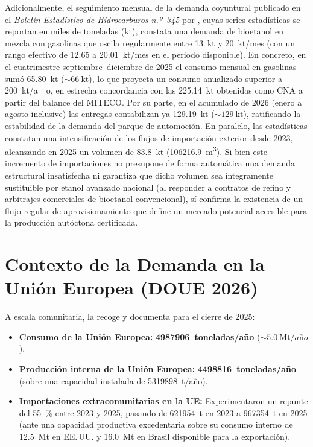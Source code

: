 \documentclass{report}
\begin{document}
Adicionalmente, el seguimiento mensual de la demanda coyuntural publicado en el \textit{Boletín Estadístico de Hidrocarburos n.º~345} por \textcite{CORES2026}, cuyas series estadísticas se reportan en miles de toneladas (\si{\kilo\tonne}), constata una demanda de bioetanol en mezcla con gasolinas que oscila regularmente entre \SI{13}{\kilo\tonne} y \SI{20}{\kilo\tonne/mes} (con un rango efectivo de \num{12.65} a \SI{20.01}{\kilo\tonne/mes} en el periodo disponible). En concreto, en el cuatrimestre septiembre--diciembre de 2025 el consumo mensual en gasolinas sumó \SI{65.80}{\kilo\tonne} ($\sim \SI{66}{\kilo\tonne}$), lo que proyecta un consumo anualizado superior a \SI{200}{\kilo\tonne/ao}, en estrecha concordancia con las \SI{225.14}{\kilo\tonne} obtenidas como CNA a partir del balance del MITECO. Por su parte, en el acumulado de 2026 (enero a agosto inclusive) las entregas contabilizan ya \SI{129.19}{\kilo\tonne} ($\sim \SI{129}{\kilo\tonne}$), ratificando la estabilidad de la demanda del parque de automoción. En paralelo, las estadísticas constatan una intensificación de los flujos de importación exterior desde 2023, alcanzando en 2025 un volumen de \SI{83.8}{\kilo\tonne} (\SI{106216.9}{\cubic\meter}). Si bien este incremento de importaciones no presupone de forma automática una demanda estructural insatisfecha ni garantiza que dicho volumen sea íntegramente sustituible por etanol avanzado nacional (al responder a contratos de refino y arbitrajes comerciales de bioetanol convencional), sí confirma la existencia de un flujo regular de aprovisionamiento que define un mercado potencial accesible para la producción autóctona certificada.

\section{Contexto de la Demanda en la Unión Europea (DOUE 2026)}
A escala comunitaria, la \textcite[Considerandos~5, 9 y~10; Cuadro~1 y Nota~7]{DOUE2026} recoge y documenta para el cierre de 2025:
\begin{itemize}
    \item \textbf{Consumo de la Unión Europea:} \textbf{\num{4987906}~toneladas/año} ($\sim \SI{5.0}{\mega\tonne/a\text{\~{n}}o}$).
    \item \textbf{Producción interna de la Unión Europea:} \textbf{\num{4498816}~toneladas/año} (sobre una capacidad instalada de \num{5319898}~t/año).
    \item \textbf{Importaciones extracomunitarias en la UE:} Experimentaron un repunte del \SI{55}{\percent} entre 2023 y 2025, pasando de \num{621954}~t en 2023 a \num{967354}~t en 2025 (ante una capacidad productiva excedentaria sobre su consumo interno de \SI{12.5}{\mega\tonne} en EE.\,UU. y \SI{16.0}{\mega\tonne} en Brasil disponible para la exportación).
\end{itemize}
\end{document}
